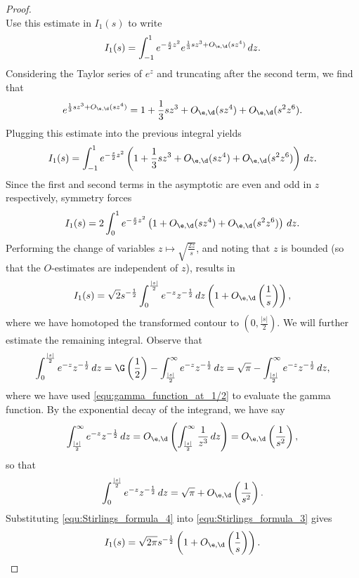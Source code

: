 \documentclass[12pt]{article}
\begin{document}
\begin{proof}
\[      \]
      Use this estimate in \(I_{1}(s)\) to write
      \[
        I_{1}(s) = \int_{-1}^{1}e^{-\frac{s}{2}z^{2}}e^{\frac{1}{3}sz^{3}+O_{\e,\d}(sz^{4})}\,dz.
      \]
       Considering the Taylor series of \(e^{z}\) and truncating after the second term, we find that
      \[
        e^{\frac{1}{3}sz^{3}+O_{\e,\d}(sz^{4})} = 1+\frac{1}{3}sz^{3}+O_{\e,\d}(sz^{4})+O_{\e,\d}(s^{2}z^{6}).
      \]
      Plugging this estimate into the previous integral yields
      \[
        I_{1}(s) = \int_{-1}^{1}e^{-\frac{s}{2}z^{2}}\left(1+\frac{1}{3}sz^{3}+O_{\e,\d}(sz^{4})+O_{\e,\d}(s^{2}z^{6})\right)\,dz.
      \]
      Since the first and second terms in the asymptotic are even and odd in \(z\) respectively, symmetry forces
      \[
        I_{1}(s) = 2\int_{0}^{1}e^{-\frac{s}{2}z^{2}}\left(1+O_{\e,\d}(sz^{4})+O_{\e,\d}(s^{2}z^{6})\right)\,dz.
      \]
      Performing the change of variables \(z \mapsto \sqrt{\frac{2z}{s}}\), and noting that \(z\) is bounded (so that the \(O\)-estimates are independent of \(z\)), results in
      \begin{equation}\label{equ:Stirlings_formula_3}
        I_{1}(s) = \sqrt{2}s^{-\frac{1}{2}}\int_{0}^{\frac{|s|}{2}}e^{-z}z^{-\frac{1}{2}}\,dz\left(1+O_{\e,\d}\left(\frac{1}{s}\right)\right),
      \end{equation}
      where we have homotoped the transformed contour to \(\left(0,\frac{|s|}{2}\right)\). We will further estimate the remaining integral. Observe that
      \[
        \int_{0}^{\frac{|s|}{2}}e^{-z}z^{-\frac{1}{2}}\,dz = \G\left(\frac{1}{2}\right)-\int_{\frac{|s|}{2}}^{\infty}e^{-z}z^{-\frac{1}{2}}\,dz = \sqrt{\pi}-\int_{\frac{|s|}{2}}^{\infty}e^{-z}z^{-\frac{1}{2}}\,dz,
      \]
      where we have used \cref{equ:gamma_function_at_1/2} to evaluate the gamma function. By the exponential decay of the integrand, we have say
      \[
        \int_{\frac{|s|}{2}}^{\infty}e^{-z}z^{-\frac{1}{2}}\,dz = O_{\e,\d}\left(\int_{\frac{|s|}{2}}^{\infty}\frac{1}{z^{3}}\,dz\right) = O_{\e,\d}\left(\frac{1}{s^{2}}\right),
      \]
      so that 
      \begin{equation}\label{equ:Stirlings_formula_4}
        \int_{0}^{\frac{|s|}{2}}e^{-z}z^{-\frac{1}{2}}\,dz = \sqrt{\pi}+O_{\e,\d}\left(\frac{1}{s^{2}}\right).
      \end{equation}
      Substituting \cref{equ:Stirlings_formula_4} into \cref{equ:Stirlings_formula_3} gives
      \begin{equation}\label{equ:Stirlings_formula_5}
        I_{1}(s) = \sqrt{2\pi}s^{-\frac{1}{2}}\left(1+O_{\e,\d}\left(\frac{1}{s}\right)\right).

\end{equation}
\end{proof}
\end{document}
